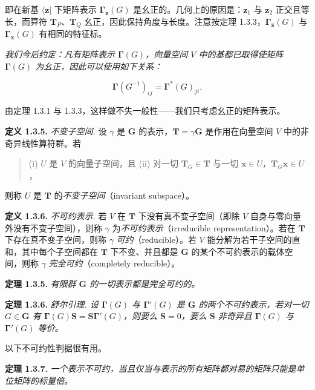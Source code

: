 即在新基 $\langle \mathbf{z}|$ 下矩阵表示 $\mathbf{\Gamma}_{\mathbf{z}}(G)$ 是幺正的。几何上的原因是：$\mathbf{z}_{1}$ 与 $\mathbf{z}_{2}$ 正交且等长，而算符 $\mathbf{T}_{P}$、$\mathbf{T}_{Q}$ 幺正，因此保持角度与长度。注意按定理 1.3.3，$\mathbf{\Gamma}_{\mathbf{z}}(G)$ 与 $\mathbf{\Gamma}_{\mathbf{x}}(G)$ 有相同的特征标。

\textit{我们今后约定：凡有矩阵表示 $\mathbf{\Gamma}(G)$，向量空间 $V$ 中的基都已取得使矩阵 $\mathbf{\Gamma}(G)$ 为幺正，因此可以使用如下关系：}

\begin{equation*}
\mathbf{\Gamma}(G^{-1})_{ij} = \mathbf{\Gamma}^{*}(G)_{ji}.
\tag{1.3.10}
\end{equation*}

由定理 1.3.1 与 1.3.3，这样做不失一般性——我们只考虑幺正的矩阵表示。

\textbf{定义 1.3.5.} \textit{不变子空间.} 设 $\gamma$ 是 $\mathbf{G}$ 的表示，$\mathbf{T} = \gamma\mathbf{G}$ 是作用在向量空间 $V$ 中的非奇异线性算符群。若

\begin{quote}
(i) $U$ 是 $V$ 的向量子空间，且
(ii) 对一切 $\mathbf{T}_{G} \in \mathbf{T}$ 与一切 $\mathbf{x} \in U$，$\mathbf{T}_{G}\mathbf{x} \in U$，
\end{quote}

则称 $U$ 是 $\mathbf{T}$ 的\textit{不变子空间}（invariant subspace）。

\textbf{定义 1.3.6.} \textit{不可约表示.} 若 $V$ 在 $\mathbf{T}$ 下没有真不变子空间（即除 $V$ 自身与零向量外没有不变子空间），则称 $\gamma$ 为\textit{不可约表示}（irreducible representation）。若在 $\mathbf{T}$ 下存在真不变子空间，则称 $\gamma$ \textit{可约}（reducible）。若 $V$ 能分解为若干子空间的直和，其中每个子空间都在 $\mathbf{T}$ 下不变、并且都是 $\mathbf{G}$ 的某个不可约表示的载体空间，则称 $\gamma$ \textit{完全可约}（completely reducible）。

\textbf{定理 1.3.5.} \textit{有限群 $\mathbf{G}$ 的一切表示都是完全可约的。}

\textbf{定理 1.3.6.} \textit{舒尔引理. 设 $\mathbf{\Gamma}(G)$ 与 $\mathbf{\Gamma}'(G)$ 是 $\mathbf{G}$ 的两个不可约表示，若对一切 $G \in \mathbf{G}$ 有 $\mathbf{\Gamma}(G)\mathbf{S} = \mathbf{S}\mathbf{\Gamma}'(G)$，则要么 $\mathbf{S} = 0$，要么 $\mathbf{S}$ 非奇异且 $\mathbf{\Gamma}(G)$ 与 $\mathbf{\Gamma}'(G)$ 等价。}

以下不可约性判据很有用。

\textbf{定理 1.3.7.} \textit{一个表示不可约，当且仅当与表示的所有矩阵都对易的矩阵只能是单位矩阵的标量倍。}

